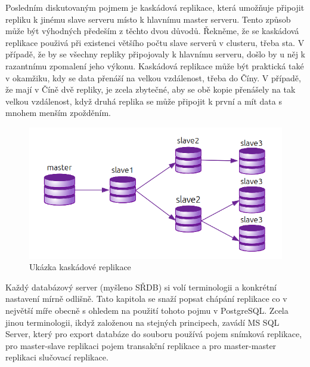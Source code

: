 Posledním diskutovaným pojmem je kaskádová replikace, která umožňuje připojit repliku k jinému slave serveru místo k hlavnímu master serveru. Tento způsob může být výhodných předeším z těchto dvou důvodů. Řekněme, že se kaskádová replikace použivá při existenci většího počtu slave serverů v clusteru, třeba sta. V případě, že by se všechny repliky připojovaly k hlavnímu serveru, došlo by u něj k razantnímu zpomalení jeho výkonu. Kaskádová replikace může být praktická také v okamžiku, kdy se data přenáší na velkou vzdálenost, třeba do Číny. V případě, že mají v Číně dvě repliky, je zcela zbytečné, aby se obě kopie přenášely na tak velkou vzdálenost, když druhá replika se může připojit k první a mít data s mnohem menším zpožděním.

          \begin{figure}[H]
            \centering
            \includegraphics[scale=1]{../../../grafy/obr/schema_kaskadova.png}
            \caption{Ukázka kaskádové replikace}
            \label{kaskadova}
          \end{figure}

Každý databázový server (myšleno SŘDB) si volí terminologii a konkrétní nastavení mírně odlišně. Tato kapitola se snaží popsat chápání replikace co v největší míře obecně s ohledem na použití tohoto pojmu v PostgreSQL. Zcela jinou terminologii, ikdyž založenou na stejných principech, zavádí MS SQL Server, který pro export databáze do souboru používá pojem snímková replikace, pro master-slave replikaci pojem transakční replikace a pro master-master replikaci slučovací replikace. 



